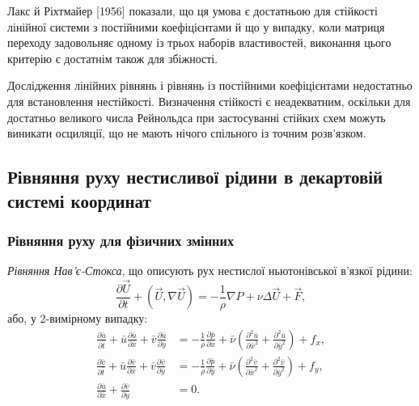 Лакс й Ріхтмайер [1956] показали, що ця умова є достатньою для стійкості лінійної системи з постійними коефіцієнтами й що у випадку, коли матриця переходу задовольняє одному із трьох наборів властивостей, виконання цього критерію є достатнім також для збіжності.

\begin{remark}
    Дослідження лінійних рівнянь і рівнянь із постійними коефіцієнтами недостатньо для встановлення нестійкості. Визначення стійкості є неадекватним, оскільки для достатньо великого числа Рейнольдса при застосуванні стійких схем можуть виникати осциляції, що не мають нічого спільного із точним розв'язком.
\end{remark}

\subsection{Рівняння руху нестисливої рідини в декартовій системі координат}

\subsubsection{Рівняння руху для фізичних змінних}

\begin{definition}
    \textit{Рівняння Нав'є-Стокса}, що описують рух нестислої ньютонівської в'язкої рідини:
    \begin{equation}
        \frac{\partial \vec U}{\partial t} + \left(\vec U, \nabla \vec U\right) = - \frac{1}{\rho} \nabla P + \nu \Delta \vec U + \vec F,
    \end{equation}
    або, у 2-вимірному випадку:
    \begin{align}
        \label{eq:1.1}
        \frac{\partial \bar u}{\partial \bar t} + \bar u \frac{\partial \bar u}{\partial \bar x} + \bar v \frac{\partial \bar u}{\partial \bar y} &= - \frac{1}{\bar \rho} \frac{\partial \bar p}{\partial \bar x} + \bar \nu \left( \frac{\partial^2 \bar u}{\partial \bar x^2} + \frac{\partial^2 \bar u}{\partial \bar y^2} \right) + f_x, \\
        \label{eq:1.2}
        \frac{\partial \bar v}{\partial \bar t} + \bar u \frac{\partial \bar v}{\partial \bar x} + \bar v \frac{\partial \bar v}{\partial \bar y} &= - \frac{1}{\bar \rho} \frac{\partial \bar p}{\partial \bar y} + \bar \nu \left( \frac{\partial^2 \bar v}{\partial \bar x^2} + \frac{\partial^2 \bar v}{\partial \bar y^2} \right) + f_y, \\
        \label{eq:1.3}
        \frac{\partial \bar u}{\partial \bar x} + \frac{\partial \bar v}{\partial \bar y} &= 0.
    \end{align}
\end{definition}

